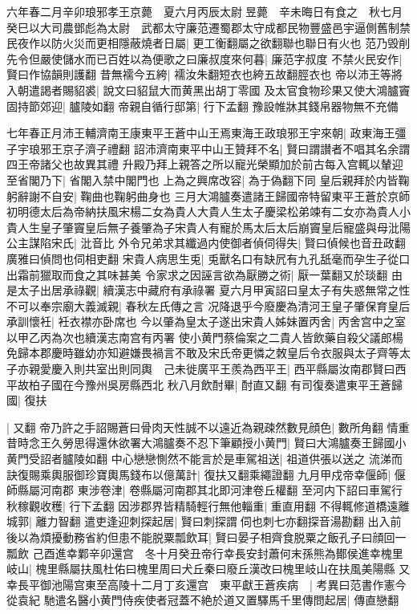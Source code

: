 六年春二月辛卯琅邪孝王京薨　夏六月丙辰太尉昱薨　辛未晦日有食之　秋七月癸巳以大司農鄧彪為太尉　武都太守廉范遷蜀郡太守成都民物豐盛邑宇逼側舊制禁民夜作以防火災而更相隱蔽燒者日屬|{
	更工衡翻屬之欲翻聯也聯日有火也}
范乃毁削先令但嚴使儲水而已百姓以為便歌之曰廉叔度來何暮|{
	廉范字叔度}
不禁火民安作|{
	賢曰作協韻則護翻}
昔無襦今五絝|{
	襦汝朱翻短衣也絝五故翻脛衣也}
帝以沛王等將入朝遣謁者賜貂裘|{
	說文曰貂鼠大而黄黑出胡丁零國}
及太官食物珍果又使大鴻臚竇固持節郊迎|{
	臚陵如翻}
帝親自循行邸第|{
	行下孟翻}
豫設帷牀其錢帛器物無不充備

七年春正月沛王輔濟南王康東平王蒼中山王焉東海王政琅邪王宇來朝|{
	政東海王彊子宇琅邪王京子濟子禮翻}
詔沛濟南東平中山王贊拜不名|{
	賢曰謂讃者不唱其名余謂四王帝諸父也故異其禮}
升殿乃拜上親答之所以寵光榮顯加於前古每入宫輒以輦迎至省閣乃下|{
	省閣入禁中閣門也}
上為之興席改容|{
	為于偽翻下同}
皇后親拜於内皆鞠躬辭謝不自安|{
	鞠曲也鞠躬曲身也}
三月大鴻臚奏遣諸王歸國帝特留東平王蒼於京師　初明德太后為帝納扶風宋楊二女為貴人大貴人生太子慶梁松弟竦有二女亦為貴人小貴人生皇子肇竇皇后無子養肇為子宋貴人有寵於馬太后太后崩竇皇后寵盛與母沘陽公主謀陷宋氏|{
	沘音比}
外令兄弟求其纖過内使御者偵伺得失|{
	賢曰偵候也音丑政翻廣雅曰偵問也伺相吏翻}
宋貴人病思生兎|{
	兎獸名口有缺凥有九孔舐毫而孕生子從口出霜前獵取而食之其味甚美}
令家求之因誣言欲為厭勝之術|{
	厭一葉翻又於琰翻}
由是太子出居承祿觀|{
	續漢志中藏府有承祿署}
夏六月甲寅詔曰皇太子有失惑無常之性不可以奉宗廟大義滅親|{
	春秋左氏傳之言}
况降退乎今廢慶為清河王皇子肇保育皇后承訓懷衽|{
	衽衣襟亦卧席也}
今以肇為皇太子遂出宋貴人姊妹置丙舍|{
	丙舍宫中之室以甲乙丙為次也續漢志南宫有丙署}
使小黄門蔡倫案之二貴人皆飲藥自殺父議郎楊免歸本郡慶時雖幼亦知避嫌畏禍言不敢及宋氏帝更憐之敇皇后令衣服與太子齊等太子亦親愛慶入則共室出則同輿　己未徙廣平王羨為西平王|{
	西平縣屬汝南郡賢曰西平故柏子國在今豫州吳房縣西北}
秋八月飲酎畢|{
	酎直又翻}
有司復奏遣東平王蒼歸國|{
	復扶}


|{
	又翻}
帝乃許之手詔賜蒼曰骨肉天性誠不以遠近為親疎然數見顔色|{
	數所角翻}
情重昔時念王久勞思得還休欲署大鴻臚奏不忍下筆顧授小黄門|{
	賢曰大鴻臚奏王歸國小黄門受詔者臚陵如翻}
中心戀戀惻然不能言於是車駕祖送|{
	祖道供張以送之}
流涕而訣復賜乘輿服御珍寶輿馬錢布以億萬計|{
	復扶又翻乘繩證翻}
九月甲戍帝幸偃師|{
	偃師縣屬河南郡}
東涉卷津|{
	卷縣屬河南郡其北即河津卷丘權翻}
至河内下詔曰車駕行秋稼觀收穫|{
	行下孟翻}
因涉郡界皆精騎輕行無他輜重|{
	重直用翻}
不得輒修道橋遠離城郭|{
	離力智翻}
遣吏逢迎刺探起居|{
	賢曰刺探謂伺也刺七亦翻探音湯勘翻}
出入前後以為煩擾動務省約但患不能脱粟瓢飲耳|{
	賢曰晏子相齊食脱粟之飯孔子曰顔回一瓢飲}
己酉進幸鄴辛卯還宫　冬十月癸丑帝行幸長安封蕭何末孫熊為鄼侯進幸槐里岐山|{
	槐里縣屬扶風杜佑曰槐里周曰犬丘秦曰廢丘漢改曰槐里岐山在扶風美陽縣}
又幸長平御池陽宫東至高陵十二月丁亥還宫　東平獻王蒼疾病　|{
	考異曰范書作憲今從袁紀}
馳遣名醫小黄門侍疾使者冠蓋不絶於道又置驛馬千里傳問起居|{
	傳直戀翻}



